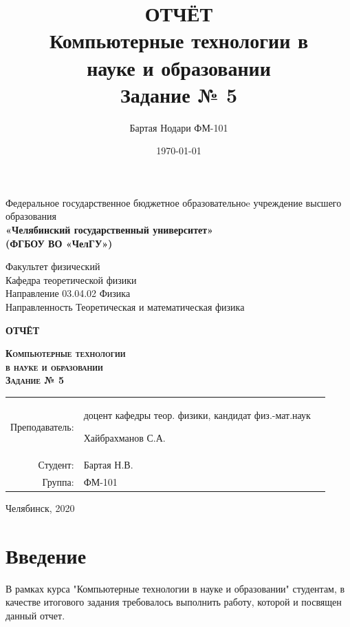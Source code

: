 \documentclass[a4paper]{article}
\author{Бартая Нодари ФМ-101}
\title{ОТЧЁТ\\ Компьютерные технологии в\\ науке и образовании\\ Задание № 5}
\date{\today}
\begin{document}
\begin{titlepage}
	\begin{center}
	Федеральное государственное бюджетное образовательноe учреждение высшего образования \\
	\textbf{«Челябинский государственный университет» \\ (ФГБОУ ВО «ЧелГУ»)}
	\end{center}
	\begin{center}
		Факультет физический			\\
		Кафедра теоретической физики	\\
		Направление 03.04.02 Физика		\\
		Направленность Теоретическая и математическая физика
	\end{center}
	\vfill
	\begin{center}
		\textbf{ОТЧЁТ}
	\end{center}
	\begin{center}
		\textsc{\textbf{Компьютерные технологии\\ в науке и образовании\\ Задание № 5}}
	\end{center}
	\vfill
	\singlespace
	\begin{flushright}
	\begin{tabular}{r p{}l}
		Преподаватель:&	доцент кафедры теор. физики, кандидат физ.-мат.наук 
		
		Хайбрахманов С.А. \\[5pt]
		Студент:&	Бартая Н.В.		\\[5pt]
		Группа:& 	ФМ-101			\\
	\end{tabular}
	\end{flushright}
	\onehalfspacing
	\vfill
	\begin{center}
		Челябинск, 2020	
	\end{center}
\end{titlepage}

\tableofcontents
\setcounter{page}{2}
\newpage
\section{Введение}
В рамках курса "Компьютерные технологии в науке и образовании" студентам, в качестве итогового задания требовалось выполнить работу, которой и посвящен данный отчет.
\end{document}

